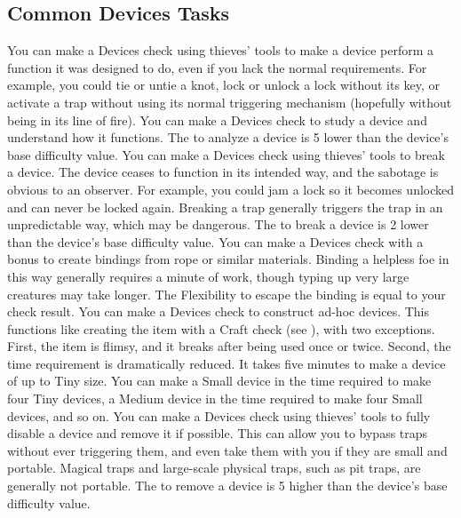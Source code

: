   \subsection{Common Devices Tasks}
     You can make a Devices check using thieves' tools to make a device perform a function it was designed to do, even if you lack the normal requirements.
    For example, you could tie or untie a knot, lock or unlock a lock without its key, or activate a trap without using its normal triggering mechanism (hopefully without being in its line of fire).
     You can make a Devices check to study a device and understand how it functions.
    The  to analyze a device is 5 lower than the device's base difficulty value.
     You can make a Devices check using thieves' tools to break a device.
    The device ceases to function in its intended way, and the sabotage is obvious to an observer.
    For example, you could jam a lock so it becomes unlocked and can never be locked again.
    Breaking a trap generally triggers the trap in an unpredictable way, which may be dangerous.
    The  to break a device is 2 lower than the device's base difficulty value.
     You can make a Devices check with a  bonus to create bindings from rope or similar materials.
    Binding a helpless foe in this way generally requires a minute of work, though typing up very large creatures may take longer.
    The Flexibility  to escape the binding is equal to your check result.
     You can make a Devices check to construct ad-hoc devices.
    This functions like creating the item with a Craft check (see ), with two exceptions.
    First, the item is flimsy, and it breaks after being used once or twice.
    Second, the time requirement is dramatically reduced.
    It takes five minutes to make a device of up to Tiny size.
    You can make a Small device in the time required to make four Tiny devices, a Medium device in the time required to make four Small devices, and so on.
     You can make a Devices check using thieves' tools to fully disable a device and remove it if possible.
    This can allow you to bypass traps without ever triggering them, and even take them with you if they are small and portable.
    Magical traps and large-scale physical traps, such as pit traps, are generally not portable.
    The  to remove a device is 5 higher than the device's base difficulty value.

